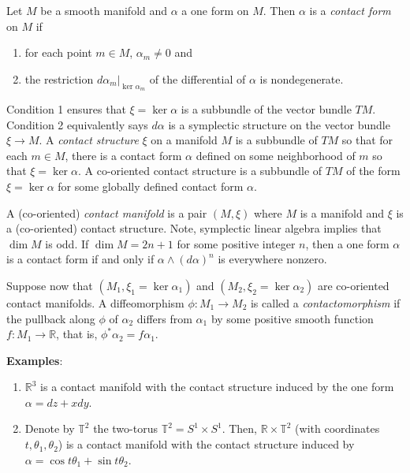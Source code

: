 \documentclass[12pt]{article}
\begin{document}
Let $M$ be a smooth manifold and $\alpha$ a one form on $M$. Then $\alpha$ is a
\emph{contact form} on $M$ if
\begin{enumerate}
\item for each point $m \in M$, $\alpha_{m} \neq 0$ and
\item the restriction $d\alpha_{m}|_{\ker{\alpha_{m}}}$ of the differential of $\alpha$
is nondegenerate.
\end{enumerate}

Condition 1 ensures that $\xi=\ker{\alpha}$ is a subbundle of the vector bundle $TM$. Condition 2 equivalently says $d\alpha$ is a symplectic structure on the vector bundle $\xi \to M$. A \emph{contact structure} $\xi$ on a manifold $M$ is a subbundle of $TM$ so that for each $m \in M$, there is a contact form $\alpha$ defined on some neighborhood of $m$ so that $\xi = \ker{\alpha}$. A co-oriented contact structure is a subbundle of $TM$ of the form $\xi=\ker{\alpha}$ for some globally defined contact form $\alpha$. 

A (co-oriented) \emph{contact manifold} is a pair $(M,\xi)$ where $M$ is a manifold and $\xi$ is a (co-oriented) contact structure. Note, symplectic linear algebra implies that $\dim{M}$ is odd. If $\dim{M} = 2n+1$ for some positive integer $n$, then a one form $\alpha$ is a contact form if and only if $\alpha \wedge (d\alpha)^{n}$ is everywhere nonzero. 

Suppose now that $(M_1,\xi_1=\ker{\alpha_1})$ and $(M_2,\xi_2=\ker{\alpha_2})$ are co-oriented contact manifolds. A diffeomorphism $\phi:M_1 \to M_2$ is called a \emph{contactomorphism} if the pullback along $\phi$ of $\alpha_2$ differs from $\alpha_1$ by some positive smooth function $f:M_1 \to \mathbb{R}$, that is, $\phi^{*}\alpha_{2} = f\alpha_{1}$.

\textbf{Examples}:
\begin{enumerate}
\item $\mathbb{R}^3$ is a contact manifold with the contact structure induced by the one form $\alpha = dz + xdy$.
\item Denote by $\mathbb{T}^{2}$ the two-torus $\mathbb{T}^{2} = S^1 \times S^1$. Then, $\mathbb{R} \times \mathbb{T}^2$ (with coordinates $t,\theta_1,\theta_2$) is a contact manifold with the contact structure induced by 
$\alpha = \cos{t\theta_1}+\sin{t\theta_2}$.
\end{enumerate}
\end{document}
